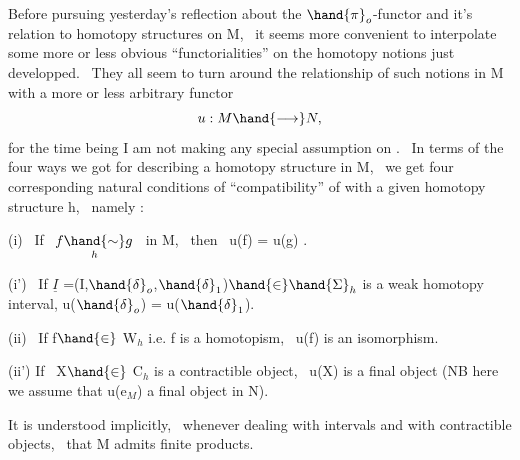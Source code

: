 
\quad Before pursuing yesterday's reflection about the $\hand{\pi}_o$-functor and
it's relation to homotopy structures on M, \ it seems more convenient to
interpolate  some more or less obvious ``functorialities'' on
the homotopy notions just developped. \ They all seem to turn around the
relationship of such notions in M with a more or less arbitrary functor
\[ u : M \hand{\longrightarrow} N , \]
for the time being I am not making any special assumption on . \ In terms
of the four ways we got for describing a homotopy structure in M, \ we get
four corresponding natural conditions of ``compatibility'' of  with a
given homotopy structure h, \ namely :

(i) \ If \ $f \underset{h}{\hand{\sim}} g$ \ in M,  \ then \ u(f) = u(g) .

(i') \ If $\underline{I}$ =(I,$\hand{\delta}_o$,$\hand{\delta}_1$)$\hand{\in}\hand{\Sigma}_h$ is a weak homotopy interval,  u($\hand{\delta}_o$) = u($\hand{\delta}_1$).

(ii) \ If f$\hand{\in}$ W$_h$ i.e. f is a homotopism, \ u(f) is an isomorphism.

(ii') If \ X$\hand{\in}$ C$_h$ is a contractible object, \ u(X) is a final object (NB
here we assume that u(e$_M$)  a final object in N).

 It is understood implicitly, \ whenever dealing with intervals and with
contractible  objects, \ that M admits finite products.\hand{)}


